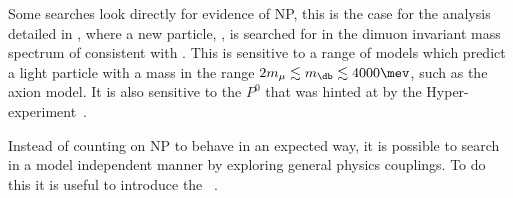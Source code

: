 

Some searches look directly for evidence of NP, this is the case for the analysis detailed in
, where a new particle, \db, is searched for in the dimuon invariant mass spectrum of
\decay{\Bd}{\Kstarent\mumu} consistent with \decay{\db}{\mumu}.
This is sensitive to a range of models which predict a light particle with a mass in the range
$2m_\mu\lesssim m_\db\lesssim4000\mev$, such as the axion model.
It is also sensitive to the $P^0$ that was hinted at by the Hyper-\CP
experiment~\cite{Park:2005eka}.

Instead of counting on NP to behave in an expected way, it is possible to search in a model
independent manner by exploring general physics couplings.
To do this it is useful to introduce the \OPE~\cite{PhysRev.179.1499}.


